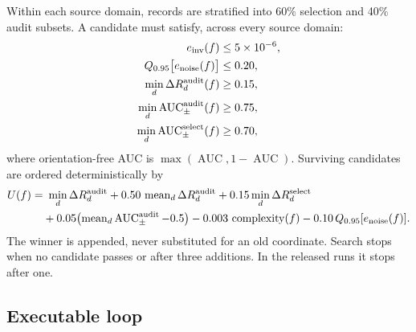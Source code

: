\documentclass[10pt]{article}
\theoremstyle{definition}
\theoremstyle{remark}
\begin{document}
Within each source domain, records are stratified into 60\% selection and 40\% audit subsets. A candidate must satisfy, across every source domain:
\begin{align}
  e_{\rm inv}(f)&\le5\times10^{-6},\\
  Q_{0.95}\bigl[e_{\rm noise}(f)\bigr]&\le0.20,\\
  \min_d\Delta R_d^{\rm audit}(f)&\ge0.15,\\
  \min_d\operatorname{AUC}^{\rm audit}_{\pm}(f)&\ge0.75,\\
  \min_d\operatorname{AUC}^{\rm select}_{\pm}(f)&\ge0.70,
  \label{eq:gates}
\end{align}
where orientation-free AUC is $\max(\operatorname{AUC},1-\operatorname{AUC})$. Surviving candidates are ordered deterministically by
\begin{align}
  U(f)=&\ \min_d\Delta R_d^{\rm audit}
  +0.50\,\operatorname{mean}_d\Delta R_d^{\rm audit}
  +0.15\min_d\Delta R_d^{\rm select}\nonumber\\
  &+0.05\bigl(\operatorname{mean}_d\operatorname{AUC}^{\rm audit}_{\pm}-0.5\bigr)
  -0.003\,\operatorname{complexity}(f)
  -0.10\,Q_{0.95}[e_{\rm noise}(f)].
  \label{eq:utility}
\end{align}
The winner is appended, never substituted for an old coordinate. Search stops when no candidate passes or after three additions. In the released runs it stops after one.

\subsection{Executable loop}
\end{document}
